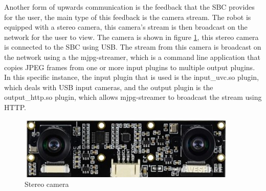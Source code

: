 Another form of upwards communication is the feedback that the SBC provides for the user, the main type of this feedback is the camera stream. The robot is equipped with a stereo camera, this camera's stream is then broadcast on the network for the user to view.
The camera is shown in figure \ref{fig:stereo-cam}, this stereo camera is connected to the SBC using USB. The stream from this camera is broadcast on the network using a the mjpg-streamer, which is a command line application that copies JPEG frames from one or more input plugins to multiple output plugins\cite{mjpg-streamer}. In this specific instance, the input plugin that is used is the input\_uvc.so plugin, which deals with USB input cameras, and the output plugin is the output\_http.so plugin, which allows mjpg-streamer to broadcast the stream using HTTP.
\begin{figure}[h!]
	\centering
	\includegraphics[scale=0.8]{./Figures/cam.jpg}
	\caption{Stereo camera}
	\label{fig:stereo-cam}
\end{figure}

